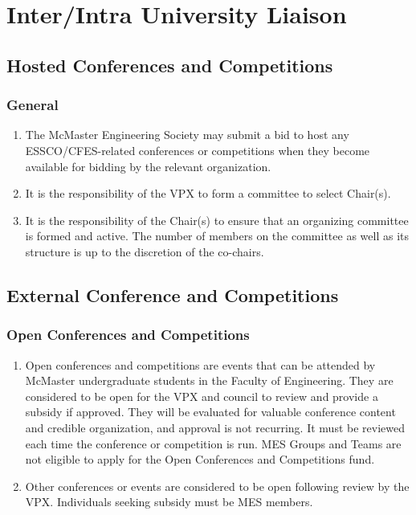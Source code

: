 \section{Inter/Intra University Liaison}
\label{interintra-university-liaison}

\subsection{Hosted Conferences and Competitions}
\label{hosted-conferences-and-competitions}

\subsubsection{General}
\label{conferences-general}

\begin{enumerate}
 \item
  The McMaster Engineering Society may submit a bid to host any ESSCO/CFES-related conferences or competitions when they become available for bidding by the relevant organization.
 \item
  It is the responsibility of the VPX to form a committee to select Chair(s).
 \item
  It is the responsibility of the Chair(s) to ensure that an organizing committee is formed and active. The number of members on the committee as well as its structure is up to the discretion of the co-chairs.

\end{enumerate}

\subsection{External Conference and Competitions}
\label{external-conference-and-competitions}

\subsubsection{Open Conferences and Competitions}
\label{open-conferences-and-competitions}

\begin{enumerate}
 \item
  Open conferences and competitions are events that can be attended by McMaster undergraduate students in the Faculty of Engineering. They are considered to be open for the VPX and council to review and provide a subsidy if approved. They will be evaluated for valuable conference content and credible organization, and approval is not recurring. It must be reviewed each time the conference or competition is run. MES Groups and Teams are not eligible to apply for the Open Conferences and Competitions fund.
 \item
  Other conferences or events are considered to be open following review by the VPX. Individuals seeking subsidy must be MES members.

\end{enumerate}

